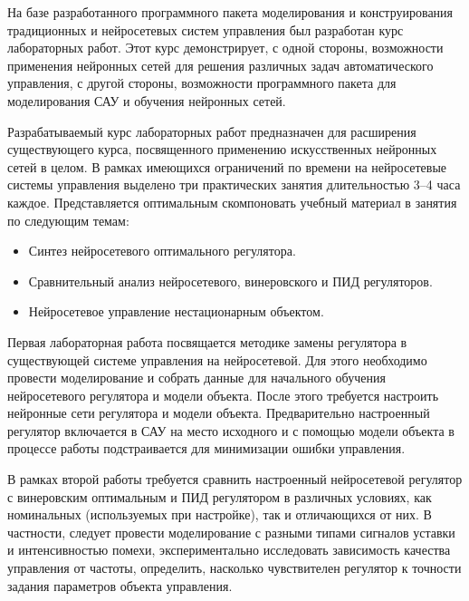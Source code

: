 
На базе разработанного программного пакета моделирования и
конструирования традиционных и нейросетевых систем управления был
разработан курс лабораторных работ.  Этот курс демонстрирует, с одной
стороны, возможности применения нейронных сетей для решения различных
задач автоматического управления, с другой стороны, возможности
программного пакета для моделирования САУ и обучения нейронных сетей.


Разрабатываемый курс лабораторных работ предназначен для расширения
существующего курса, посвященного применению искусственных нейронных
сетей в целом.  В рамках имеющихся ограничений по времени на
нейросетевые системы управления выделено три практических занятия
длительностью 3--4 часа каждое.  Представляется оптимальным
скомпоновать учебный материал в занятия по следующим темам:

\begin{itemize}
\item Синтез нейросетевого оптимального регулятора.
\item Сравнительный анализ нейросетевого, винеровского и ПИД регуляторов.
\item Нейросетевое управление нестационарным объектом.
\end{itemize}

Первая лабораторная работа посвящается методике замены регулятора в
существующей системе управления на нейросетевой.  Для этого необходимо
провести моделирование и собрать данные для начального обучения
нейросетевого регулятора и модели объекта.  После этого требуется
настроить нейронные сети регулятора и модели объекта.  Предварительно
настроенный регулятор включается в САУ на место исходного и с помощью
модели объекта в процессе работы подстраивается для минимизации ошибки
управления.

В рамках второй работы требуется сравнить настроенный нейросетевой
регулятор с винеровским оптимальным и ПИД регулятором в различных
условиях, как номинальных (используемых при настройке), так и
отличающихся от них.  В частности, следует провести моделирование с
разными типами сигналов уставки и интенсивностью помехи,
экспериментально исследовать зависимость качества управления от
частоты, определить, насколько чувствителен регулятор к точности
задания параметров объекта управления.

